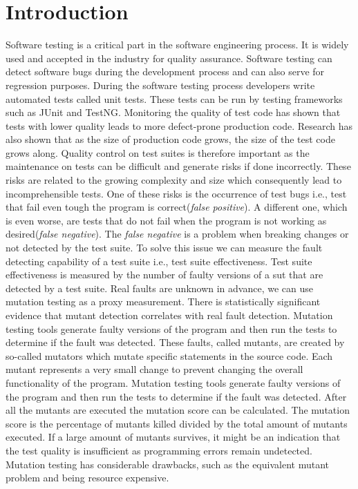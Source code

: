 \documentclass[../main]{subfiles}
\begin{document}
\chapter{Introduction}
\label{ch:introduction}
Software testing is a critical part in the software engineering process. It is widely used and accepted in the industry for quality assurance. 
Software testing can detect software bugs during the development process and can also serve for regression purposes\cite{Bertolino2007SoftwareDreams}. 
During the software testing process developers write automated tests called unit tests. 
These tests can be run by testing frameworks such as JUnit and TestNG\cite{JUnit, TestNG}.
Monitoring the quality of test code has shown that tests with lower quality leads to more defect-prone production code\cite{Spadini2018OnQuality}. 
Research has also shown that as the size of production code grows, the size of the test code grows along\cite{Zaidman2008MiningCode}. 
Quality control on test suites is therefore important as the maintenance on tests can be difficult and generate risks if done incorrectly\cite{Horvath2015TestMetrics}.
These risks are related to the growing complexity and size which consequently lead to incomprehensible tests. 
One of these risks is the occurrence of test bugs i.e., test that fail even tough the program is correct(\textit{false positive}). 
A different one, which is even worse, are tests that do not fail when the program is not working as desired(\textit{false negative}).
The \textit{false negative} is a problem when breaking changes or not detected by the test suite.
To solve this issue we can measure the fault detecting capability of a test suite i.e., test suite effectiveness.
\newline
Test suite effectiveness is measured by the number of faulty versions of a \acrfull{sut} that are detected by a test suite. 
Real faults are unknown in advance, we can use mutation testing as a proxy measurement. 
There is statistically significant evidence that mutant detection correlates with real fault detection\cite{Just2014AreTesting}.
\newline
Mutation testing tools generate faulty versions of the program and then run the tests to determine
if the fault was detected. These faults, called mutants, are created by so-called mutators which mutate
specific statements in the source code. Each mutant represents a very small change to prevent changing
the overall functionality of the program\cite{Lipton1978HintsProgrammer}.
\newline
Mutation testing tools generate faulty versions of the program and then run the tests to determine if the fault was detected.
After all the mutants are executed the mutation score can be calculated. 
The mutation score is the percentage of mutants killed divided by the total amount of mutants executed.
If a large amount of mutants survives, it might be an indication that the test quality is insufficient as programming errors remain undetected.
Mutation testing has considerable drawbacks, such as the equivalent mutant problem and being resource expensive.
\end{document}
